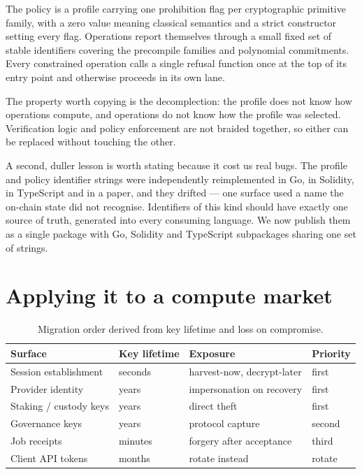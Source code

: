 \documentclass[11pt,a4paper]{article}
\begin{document}
The policy is a profile carrying one prohibition flag per cryptographic
primitive family, with a zero value meaning classical semantics and a strict
constructor setting every flag. Operations report themselves through a small
fixed set of stable identifiers covering the precompile families and polynomial
commitments. Every constrained operation calls a single refusal function once at
the top of its entry point and otherwise proceeds in its own lane.

The property worth copying is the decomplection: the profile does not know how
operations compute, and operations do not know how the profile was selected.
Verification logic and policy enforcement are not braided together, so either can
be replaced without touching the other.

A second, duller lesson is worth stating because it cost us real bugs. The
profile and policy identifier strings were independently reimplemented in Go, in
Solidity, in TypeScript and in a paper, and they drifted --- one surface used a
name the on-chain state did not recognise. Identifiers of this kind should have
exactly one source of truth, generated into every consuming language. We now
publish them as a single package with Go, Solidity and TypeScript subpackages
sharing one set of strings.

\section{Applying it to a compute market}

\begin{table}[h]
\centering
\begin{tabular}{llll}
\toprule
Surface & Key lifetime & Exposure & Priority \\
\midrule
Session establishment & seconds & harvest-now, decrypt-later & first \\
Provider identity & years & impersonation on recovery & first \\
Staking / custody keys & years & direct theft & first \\
Governance keys & years & protocol capture & second \\
Job receipts & minutes & forgery after acceptance & third \\
Client API tokens & months & rotate instead & rotate \\
\bottomrule
\end{tabular}
\caption{Migration order derived from key lifetime and loss on compromise.}
\end{table}
\end{document}
